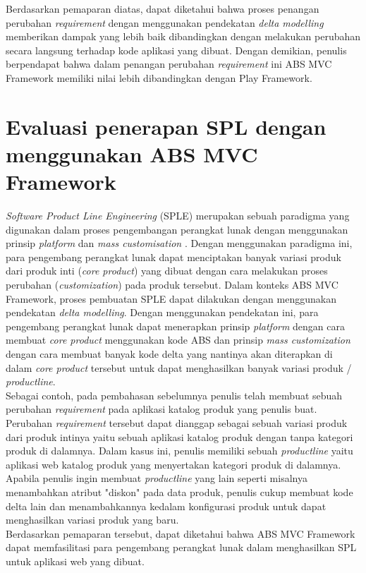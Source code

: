 Berdasarkan pemaparan diatas, dapat diketahui bahwa proses penangan perubahan \textit{requirement} dengan menggunakan pendekatan \textit{delta modelling} memberikan dampak yang lebih baik dibandingkan dengan melakukan perubahan secara langsung terhadap kode aplikasi yang dibuat. Dengan demikian, penulis berpendapat bahwa dalam penangan perubahan \textit{requirement} ini ABS MVC Framework memiliki nilai lebih dibandingkan dengan Play Framework.

\section{Evaluasi penerapan SPL dengan menggunakan ABS MVC Framework}

\textit{Software Product Line Engineering} (SPLE) merupakan sebuah paradigma yang digunakan dalam proses pengembangan perangkat lunak dengan menggunakan prinsip \textit{platform} dan \textit{mass customisation} \citep[p.~14]{pohl2005software}. Dengan menggunakan paradigma ini, para pengembang perangkat lunak dapat menciptakan banyak variasi produk dari produk inti (\textit{core product}) yang dibuat dengan cara melakukan proses perubahan (\textit{customization}) pada produk tersebut. Dalam konteks ABS MVC Framework, proses pembuatan SPLE dapat dilakukan dengan menggunakan pendekatan \textit{delta modelling}. Dengan menggunakan pendekatan ini, para pengembang perangkat lunak dapat menerapkan prinsip \textit{platform} dengan cara membuat \textit{core product} menggunakan kode ABS dan prinsip \textit{mass customization} dengan cara membuat banyak kode delta yang nantinya akan diterapkan di dalam \textit{core product} tersebut untuk dapat menghasilkan banyak variasi produk / \textit{productline}.\\

Sebagai contoh, pada pembahasan sebelumnya penulis telah membuat sebuah perubahan \textit{requirement} pada aplikasi katalog produk yang penulis buat. Perubahan \textit{requirement} tersebut dapat dianggap sebagai sebuah variasi produk dari produk intinya yaitu sebuah aplikasi katalog produk dengan tanpa kategori produk di dalamnya. Dalam kasus ini, penulis memiliki sebuah \textit{productline} yaitu aplikasi web katalog produk yang menyertakan kategori produk di dalamnya. Apabila penulis ingin membuat \textit{productline} yang lain seperti misalnya menambahkan atribut "diskon" pada data produk, penulis cukup membuat kode delta lain dan menambahkannya kedalam konfigurasi produk untuk dapat menghasilkan variasi produk yang baru.\\

Berdasarkan pemaparan tersebut, dapat diketahui bahwa ABS MVC Framework dapat memfasilitasi para pengembang perangkat lunak dalam menghasilkan SPL untuk aplikasi web yang dibuat.